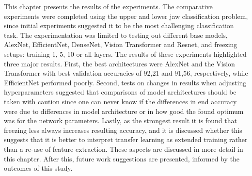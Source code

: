 \documentclass{article}
\begin{document}
This chapter presents the results of the experiments. The comparative experiments were completed using the 
upper and lower jaw classification problem, since initial experiments suggested it to be the most challenging 
classification task. The experimentation was limited to testing out different base models, AlexNet, EfficientNet, 
DenseNet, Vision Transformer and Resnet, and freezing setups: training 1, 5, 10 or all layers.
The results of these experiments highlighted three major results. First, the best architectures were AlexNet and the Vision 
Transformer with best validation accuracies of 92,21 and 91,56, respectively, while EfficientNet performed poorly. Second, tests on changes in results 
when adjusting hyperparameters suggested that comparisons of model architectures should be taken with caution since one can never know 
if the differences in end accuracy were due to differences in model architecture or in how good the found optimum was 
for the network parameters. Lastly, as the strongest result it is found that freezing less 
always increases resulting accuracy, and it is discussed whether this suggests that it is better to interpret transfer learning as extended 
training rather than a re-use of feature extraction. These aspects are discussed in more detail in this chapter. After this, future work 
suggestions are presented, informed by the outcomes of this study.
\end{document}
